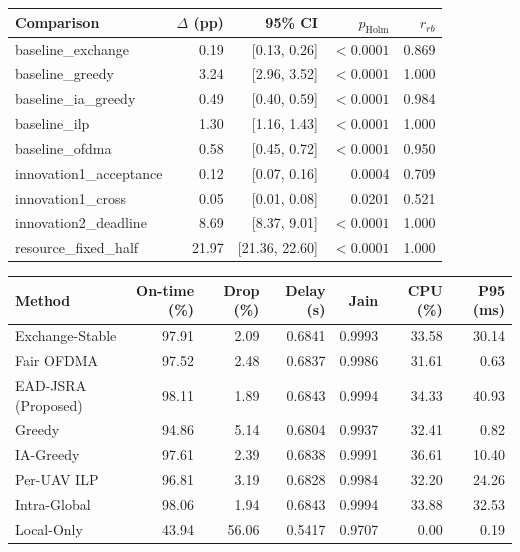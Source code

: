 \begin{tabular}{lrrrr}
\toprule
Comparison & $\Delta$ (pp) & 95\% CI & $p_{\mathrm{Holm}}$ & $r_{rb}$ \\
\midrule
baseline\_exchange & 0.19 & [0.13, 0.26] & $<0.0001$ & 0.869 \\
baseline\_greedy & 3.24 & [2.96, 3.52] & $<0.0001$ & 1.000 \\
baseline\_ia\_greedy & 0.49 & [0.40, 0.59] & $<0.0001$ & 0.984 \\
baseline\_ilp & 1.30 & [1.16, 1.43] & $<0.0001$ & 1.000 \\
baseline\_ofdma & 0.58 & [0.45, 0.72] & $<0.0001$ & 0.950 \\
innovation1\_acceptance & 0.12 & [0.07, 0.16] & 0.0004 & 0.709 \\
innovation1\_cross & 0.05 & [0.01, 0.08] & 0.0201 & 0.521 \\
innovation2\_deadline & 8.69 & [8.37, 9.01] & $<0.0001$ & 1.000 \\
resource\_fixed\_half & 21.97 & [21.36, 22.60] & $<0.0001$ & 1.000 \\
\bottomrule
\end{tabular}

\bigskip

\begin{tabular}{lrrrrrr}
\toprule
Method & On-time (\%) & Drop (\%) & Delay (s) & Jain & CPU (\%) & P95 (ms) \\
\midrule
Exchange-Stable & 97.91 & 2.09 & 0.6841 & 0.9993 & 33.58 & 30.14 \\
Fair OFDMA & 97.52 & 2.48 & 0.6837 & 0.9986 & 31.61 & 0.63 \\
EAD-JSRA (Proposed) & 98.11 & 1.89 & 0.6843 & 0.9994 & 34.33 & 40.93 \\
Greedy & 94.86 & 5.14 & 0.6804 & 0.9937 & 32.41 & 0.82 \\
IA-Greedy & 97.61 & 2.39 & 0.6838 & 0.9991 & 36.61 & 10.40 \\
Per-UAV ILP & 96.81 & 3.19 & 0.6828 & 0.9984 & 32.20 & 24.26 \\
Intra-Global & 98.06 & 1.94 & 0.6843 & 0.9994 & 33.88 & 32.53 \\
Local-Only & 43.94 & 56.06 & 0.5417 & 0.9707 & 0.00 & 0.19 \\
\bottomrule
\end{tabular}
